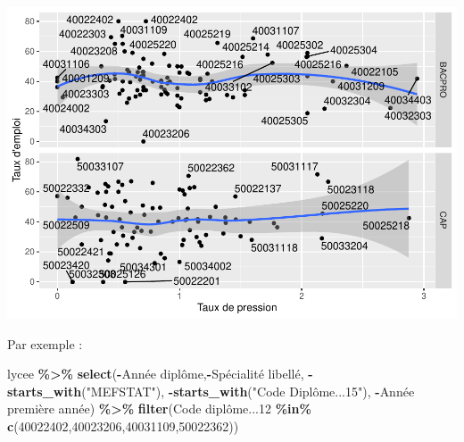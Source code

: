 \documentclass[
]{book}
\newenvironment{Shaded}{\begin{snugshade}}{\end{snugshade}}
\newcommand{\AttributeTok}[1]{\textcolor[rgb]{0.13,0.29,0.53}{#1}}
\newcommand{\DecValTok}[1]{\textcolor[rgb]{0.00,0.00,0.81}{#1}}
\newcommand{\FunctionTok}[1]{\textcolor[rgb]{0.13,0.29,0.53}{\textbf{#1}}}
\newcommand{\NormalTok}[1]{#1}
\newcommand{\SpecialCharTok}[1]{\textcolor[rgb]{0.81,0.36,0.00}{\textbf{#1}}}
\newcommand{\StringTok}[1]{\textcolor[rgb]{0.31,0.60,0.02}{#1}}
\begin{document}
\includegraphics{_main_files/figure-latex/lycee6-1.pdf}

Par exemple :

\begin{Shaded}
\begin{Highlighting}[]
\NormalTok{lycee }\SpecialCharTok{\%\textgreater{}\%} \FunctionTok{select}\NormalTok{(}\SpecialCharTok{{-}}\StringTok{\textasciigrave{}}\AttributeTok{Année diplôme}\StringTok{\textasciigrave{}}\NormalTok{,}\SpecialCharTok{{-}}\StringTok{\textasciigrave{}}\AttributeTok{Spécialité libellé}\StringTok{\textasciigrave{}}\NormalTok{,}
                 \SpecialCharTok{{-}}\FunctionTok{starts\_with}\NormalTok{(}\StringTok{"MEFSTAT"}\NormalTok{),}
                 \SpecialCharTok{{-}}\FunctionTok{starts\_with}\NormalTok{(}\StringTok{"Code Diplôme...15"}\NormalTok{),}
                 \SpecialCharTok{{-}}\StringTok{\textasciigrave{}}\AttributeTok{Année première année}\StringTok{\textasciigrave{}}\NormalTok{) }\SpecialCharTok{\%\textgreater{}\%} 
  \FunctionTok{filter}\NormalTok{(}\StringTok{\textasciigrave{}}\AttributeTok{Code diplôme...12}\StringTok{\textasciigrave{}} \SpecialCharTok{\%in\%} \FunctionTok{c}\NormalTok{(}\DecValTok{40022402}\NormalTok{,}\DecValTok{40023206}\NormalTok{,}\DecValTok{40031109}\NormalTok{,}\DecValTok{50022362}\NormalTok{))}
\end{Highlighting}
\end{Shaded}
\end{document}
